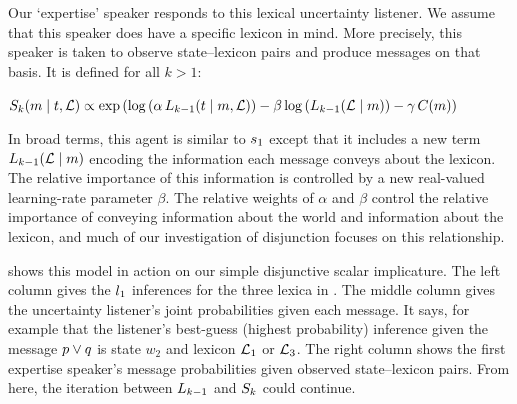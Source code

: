 \documentclass{article}
\begin{document}
Our `expertise' speaker responds to this lexical uncertainty listener.
We assume that this speaker does have a specific lexicon in mind.  More
precisely, this speaker is taken to observe state--lexicon pairs and
produce messages on that basis. It is defined for all $k > 1$:

\begin{examples}  
  \item\label{Sk}%
    $\SpeakerK(\msg \given \state, \Lex) \propto 
    \exp
    \left(
      \log
      \left(\alpha\,\ListenerK[k-1](\state \given \msg, \Lex)\right)
      - 
      \beta \log\left(\ListenerK[k-1](\Lex\given\msg)\right)
      -
      \gamma\,\Costs(\msg)
    \right)$
\end{examples}
%
In broad terms, this agent is similar to $\speakerOne$ except that it
includes a new term $\ListenerK[k-1](\Lex\given\msg)$ encoding the
information each message conveys about the lexicon. The relative
importance of this information is controlled by a new real-valued
learning-rate parameter $\beta$. The relative weights of $\alpha$ and
$\beta$ control the relative importance of conveying information about
the world and information about the lexicon, and much of our
investigation of disjunction focuses on this relationship.

 shows this model in action on our simple
disjunctive scalar implicature. The left column gives the
$\listenerOne$ inferences for the three lexica in
. The middle column gives the uncertainty
listener's joint probabilities given each message. It says, for
example that the listener's best-guess (highest probability) inference
given the message $\porq$ is state $w_{2}$ and lexicon $\Lex_{1}$ or
$\Lex_{3}$. The right column shows the first expertise speaker's
message probabilities given observed state--lexicon pairs. From here,
the iteration between $\ListenerK[k-1]$ and $\SpeakerK$ could continue.
\end{document}
